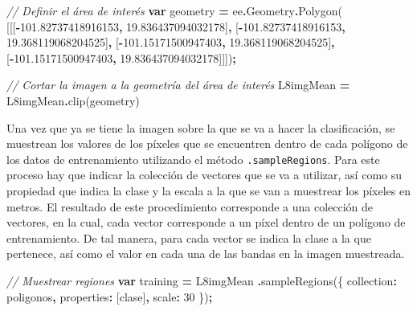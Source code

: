 \documentclass[
  12pt,
  letterpaper,
  twoside]{book}
\newenvironment{Shaded}{\begin{snugshade}}{\end{snugshade}}
\newcommand{\AttributeTok}[1]{\textcolor[rgb]{0.77,0.63,0.00}{#1}}
\newcommand{\CommentTok}[1]{\textcolor[rgb]{0.56,0.35,0.01}{\textit{#1}}}
\newcommand{\DataTypeTok}[1]{\textcolor[rgb]{0.13,0.29,0.53}{#1}}
\newcommand{\DecValTok}[1]{\textcolor[rgb]{0.00,0.00,0.81}{#1}}
\newcommand{\FloatTok}[1]{\textcolor[rgb]{0.00,0.00,0.81}{#1}}
\newcommand{\FunctionTok}[1]{\textcolor[rgb]{0.00,0.00,0.00}{#1}}
\newcommand{\KeywordTok}[1]{\textcolor[rgb]{0.13,0.29,0.53}{\textbf{#1}}}
\newcommand{\NormalTok}[1]{#1}
\newcommand{\OperatorTok}[1]{\textcolor[rgb]{0.81,0.36,0.00}{\textbf{#1}}}
\newcommand{\StringTok}[1]{\textcolor[rgb]{0.31,0.60,0.02}{#1}}
\begin{document}
\begin{Shaded}
\begin{Highlighting}[]
\CommentTok{// Definir el área de interés}
\KeywordTok{var}\NormalTok{ geometry }\OperatorTok{=}\NormalTok{ ee}\OperatorTok{.}\AttributeTok{Geometry}\OperatorTok{.}\FunctionTok{Polygon}\NormalTok{(}
\NormalTok{        [[[}\OperatorTok{{-}}\FloatTok{101.82737418916153}\OperatorTok{,} \FloatTok{19.836437094032178}\NormalTok{]}\OperatorTok{,}
\NormalTok{          [}\OperatorTok{{-}}\FloatTok{101.82737418916153}\OperatorTok{,} \FloatTok{19.368119068204525}\NormalTok{]}\OperatorTok{,}
\NormalTok{          [}\OperatorTok{{-}}\FloatTok{101.15171500947403}\OperatorTok{,} \FloatTok{19.368119068204525}\NormalTok{]}\OperatorTok{,}
\NormalTok{          [}\OperatorTok{{-}}\FloatTok{101.15171500947403}\OperatorTok{,} \FloatTok{19.836437094032178}\NormalTok{]]])}\OperatorTok{;}
          
\CommentTok{// Cortar la imagen a la geometría del área de interés}
\NormalTok{L8imgMean }\OperatorTok{=}\NormalTok{ L8imgMean}\OperatorTok{.}\FunctionTok{clip}\NormalTok{(geometry)}
\end{Highlighting}
\end{Shaded}

Una vez que ya se tiene la imagen sobre la que se va a hacer la clasificación, se muestrean los valores de los píxeles que se encuentren dentro de cada polígono de los datos de entrenamiento utilizando el método \texttt{.sampleRegions}. Para este proceso hay que indicar la colección de vectores que se va a utilizar, así como su propiedad que indica la clase y la escala a la que se van a muestrear los píxeles en metros. El resultado de este procedimiento corresponde a una colección de vectores, en la cual, cada vector corresponde a un píxel dentro de un polígono de entrenamiento. De tal manera, para cada vector se indica la clase a la que pertenece, así como el valor en cada una de las bandas en la imagen muestreada.

\begin{Shaded}
\begin{Highlighting}[]
\CommentTok{// Muestrear regiones }
\KeywordTok{var}\NormalTok{ training }\OperatorTok{=}\NormalTok{ L8imgMean}
  \OperatorTok{.}\FunctionTok{sampleRegions}\NormalTok{(\{}
    \DataTypeTok{collection}\OperatorTok{:}\NormalTok{ poligonos}\OperatorTok{,}
    \DataTypeTok{properties}\OperatorTok{:}\NormalTok{ [}\StringTok{\textquotesingle{}clase\textquotesingle{}}\NormalTok{]}\OperatorTok{,}
    \DataTypeTok{scale}\OperatorTok{:} \DecValTok{30}
\NormalTok{  \})}\OperatorTok{;}
\end{Highlighting}
\end{Shaded}
\end{document}
